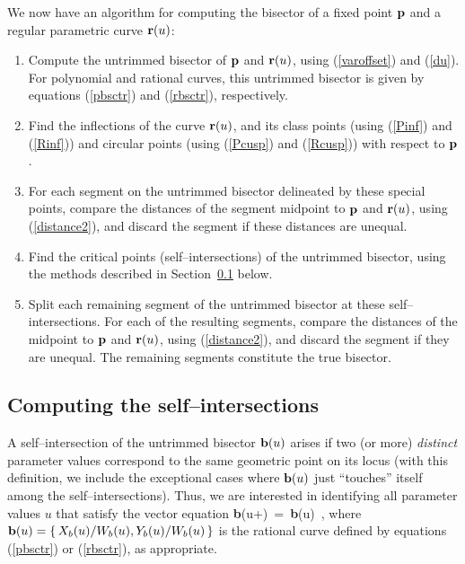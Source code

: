 We now have an algorithm for computing the bisector of a fixed point
${\bf p}$ and a regular parametric curve ${\bf r}(u)$:

\begin{enumerate}
\item
        Compute the untrimmed bisector of ${\bf p}$ and ${\bf r}(u)$,
        using (\ref{varoffset}) and (\ref{du}). For polynomial and
        rational curves, this untrimmed bisector is given by equations
        (\ref{pbsctr}) and (\ref{rbsctr}), respectively.
\item
        Find the inflections of the curve ${\bf r}(u)$, and its class
        points (using (\ref{Pinf}) and (\ref{Rinf}))
	and circular points (using (\ref{Pcusp}) and (\ref{Rcusp}))
	with respect to ${\bf p}$.
\item
        For each segment on the untrimmed bisector delineated by these
        special points, compare the distances of the segment midpoint
        to ${\bf p}$ and ${\bf r}(u)$, using (\ref{distance2}), and
        discard the segment if these distances are unequal.
\item
        Find the critical points (self--intersections) of the untrimmed
        bisector, using the methods described in Section~\ref{sec:slfint}
        below.
\item
        Split each remaining segment of the untrimmed bisector at these
        self--intersections. For each of the resulting segments, compare
        the distances of the midpoint to ${\bf p}$ and ${\bf r}(u)$,
        using (\ref{distance2}), and discard the segment if they are
        unequal. The remaining segments constitute the true bisector.
\end{enumerate}

\subsection{Computing the self--intersections}
\label{sec:slfint}

A self--intersection of the untrimmed bisector ${\bf b}(u)$ arises
if two (or more) {\it distinct\/} parameter values correspond to the
same geometric point on its locus (with this definition, we include
the exceptional cases where ${\bf b}(u)$ just ``touches'' itself among
the self--intersections). Thus, we are interested in identifying all
parameter values $u$ that satisfy the vector equation
\be \label{selfint}
{\bf b}(u+\xi) \,=\, {\bf b}(u)  \xi{} \,,
\ee
where ${\bf b}(u)=\{\,X_b(u)/W_b(u),Y_b(u)/W_b(u)\,\}$ is the rational
curve defined by equations (\ref{pbsctr}) or (\ref{rbsctr}), as
appropriate.

